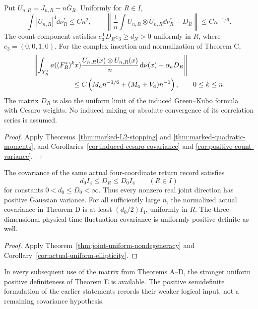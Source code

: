 \begin{maintheorem}
\label{thm:intro-actual-moments}
Put $U_{n,R}=J_{n,R}-n\bar G_R$. Uniformly for $R\in I$,
\[
 \int |U_{n,R}|^4\dd\nu_R^*\le Cn^2,\qquad
 \left\|\frac1n\int U_{n,R}\otimes U_{n,R}\dd\nu_R^*-D_R\right\|
       \le Cn^{-1/6}.
\]
The count component satisfies $e_3^{\mathsf T}D_Re_3\ge d_N>0$
uniformly in $R$, where $e_3=(0,0,1,0)$.
For the complex insertion and normalization of Theorem C,
\begin{align*}
 &\left\|\int_{Y_R^*}a((F_R^*)^kx)
       \frac{U_{n,R}(x)\otimes U_{n,R}(x)}n\dd\nu(x)-\alpha_aD_R\right\|\\
 &\hspace{20mm}\le C\left(M_an^{-1/6}+(M_a+V_a)n^{-1}\right),
       \qquad 0\le k\le n.
\end{align*}
The matrix $D_R$ is also the uniform limit of the induced Green--Kubo
formula with Cesaro weights. No induced mixing or absolute convergence
of its correlation series is assumed.
\end{maintheorem}
\begin{proof}
Apply Theorems~\ref{thm:marked-L2-stopping} and
\ref{thm:marked-quadratic-moments}, and
Corollaries~\ref{cor:induced-cesaro-covariance} and
\ref{cor:positive-count-variance}.
\end{proof}

\begin{maintheorem}
\label{thm:intro-joint-nondegeneracy}
The covariance of the same actual four-coordinate return record satisfies
\[
 d_0 I_4\le D_R\le D_0 I_4\qquad(R\in I)
\]
for constants $0<d_0\le D_0<\infty$. Thus every nonzero real joint
direction has positive Gaussian variance. For all sufficiently large
$n$, the normalized actual covariance in Theorem D is at least
$(d_0/2)I_4$, uniformly in $R$. The three-dimensional physical-time
fluctuation covariance is uniformly positive definite as well.
\end{maintheorem}
\begin{proof}
Apply Theorem~\ref{thm:joint-uniform-nondegeneracy} and
Corollary~\ref{cor:actual-uniform-ellipticity}.
\end{proof}
In every subsequent use of the matrix from Theorems A--D, the stronger
uniform positive definiteness of Theorem E is available. The positive
semidefinite formulation of the earlier statements records their weaker
logical input, not a remaining covariance hypothesis.


